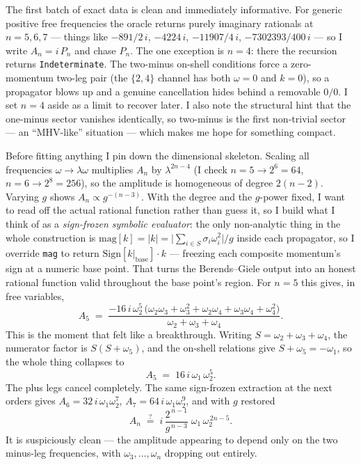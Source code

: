 \documentclass{article}
\begin{document}
The first batch of exact data is clean and immediately informative. For generic
positive free frequencies the oracle returns purely imaginary rationals at
$n=5,6,7$ --- things like $-891/2\,i$, $-4224\,i$, $-11907/4\,i$,
$-7302393/400\,i$ --- so I write $A_n=i\,P_n$ and chase $P_n$. The one exception
is $n=4$: there the recursion returns \texttt{Indeterminate}. The two-minus
on-shell conditions force a zero-momentum two-leg pair (the $\{2,4\}$ channel has
both $\omega=0$ and $k=0$), so a propagator blows up and a genuine cancellation
hides behind a removable $0/0$. I set $n=4$ aside as a limit to recover later.
I also note the structural hint that the one-minus sector vanishes identically, so
two-minus is the first non-trivial sector --- an ``MHV-like'' situation --- which
makes me hope for something compact.

Before fitting anything I pin down the dimensional skeleton. Scaling all
frequencies $\omega\to\lambda\omega$ multiplies $A_n$ by $\lambda^{2n-4}$ (I check
$n=5\to2^6=64$, $n=6\to2^8=256$), so the amplitude is homogeneous of degree
$2(n-2)$. Varying $g$ shows $A_n\propto g^{-(n-3)}$. With the degree and the
$g$-power fixed, I want to read off the actual rational function rather than
guess it, so I build what I think of as a \emph{sign-frozen symbolic evaluator}:
the only non-analytic thing in the whole construction is
$\mathrm{mag}[k]=|k|=\big|\sum_{i\in S}\sigma_i\omega_i^2\big|/g$ inside each
propagator, so I override \texttt{mag} to return $\mathrm{Sign}[k|_{\text{base}}]\cdot k$
--- freezing each composite momentum's sign at a numeric base point. That turns
the Berends--Giele output into an honest rational function valid throughout the
base point's region. For $n=5$ this gives, in free variables,
\[
A_5 \;=\; \frac{-16\,i\,\omega_2^{5}\,
\big(\omega_2\omega_3+\omega_3^{2}+\omega_2\omega_4+\omega_3\omega_4+\omega_4^{2}\big)}
{\omega_2+\omega_3+\omega_4}.
\]
This is the moment that felt like a breakthrough. Writing $S=\omega_2+\omega_3+\omega_4$,
the numerator factor is $S(S+\omega_5)$, and the on-shell relations give
$S+\omega_5=-\omega_1$, so the whole thing collapses to
\[
A_5 \;=\; 16\,i\,\omega_1\,\omega_2^{5}.
\]
The plus legs cancel completely. The same sign-frozen extraction at the next
orders gives $A_6=32\,i\,\omega_1\omega_2^{7}$, $A_7=64\,i\,\omega_1\omega_2^{9}$,
and with $g$ restored
\[
A_n \;\stackrel{?}{=}\; i\,\frac{2^{\,n-1}}{g^{\,n-3}}\;\omega_1\,\omega_2^{\,2n-5}.
\]
It is suspiciously clean --- the amplitude appearing to depend only on the two
minus-leg frequencies, with $\omega_3,\dots,\omega_n$ dropping out entirely.
\end{document}
